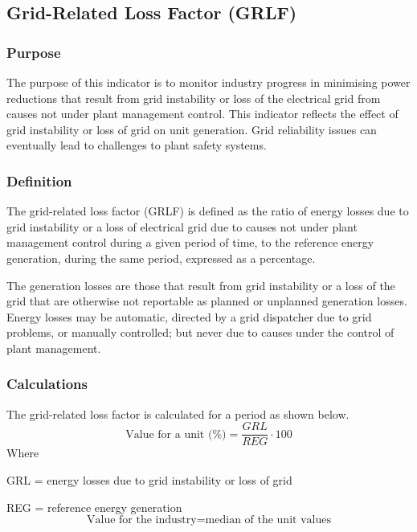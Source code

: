 \subsection{Grid-Related Loss Factor (GRLF)}

\subsubsection{Purpose}

The purpose of this indicator is to monitor industry progress in
minimising power reductions that result from grid instability or loss
of the electrical grid from causes not under plant management
control. This indicator reflects the effect of grid instability or
loss of grid on unit generation. Grid reliability issues can
eventually lead to challenges to plant safety systems.

\subsubsection{Definition}

The grid-related loss factor (GRLF) is defined as the ratio of energy
losses due to grid instability or a loss of electrical grid due to
causes not under plant management control during a given period of
time, to the reference energy generation, during the same period,
expressed as a percentage. 

The generation losses are those that result from grid instability or a
loss of the grid that are otherwise not reportable as planned or
unplanned generation losses. Energy losses may be automatic, directed
by a grid dispatcher due to grid problems, or manually controlled; but
never due to causes under the control of plant management.

\subsubsection{Calculations}

The grid-related loss factor is calculated for a period as shown below.
$$ \text{Value for a unit (\%)} = \frac{GRL}{REG} \cdot 100 $$		 
Where	

GRL = energy losses due to grid instability or loss of grid 

REG = reference energy generation 
$$ \text{Value for the industry} = \text{median of the unit values} $$